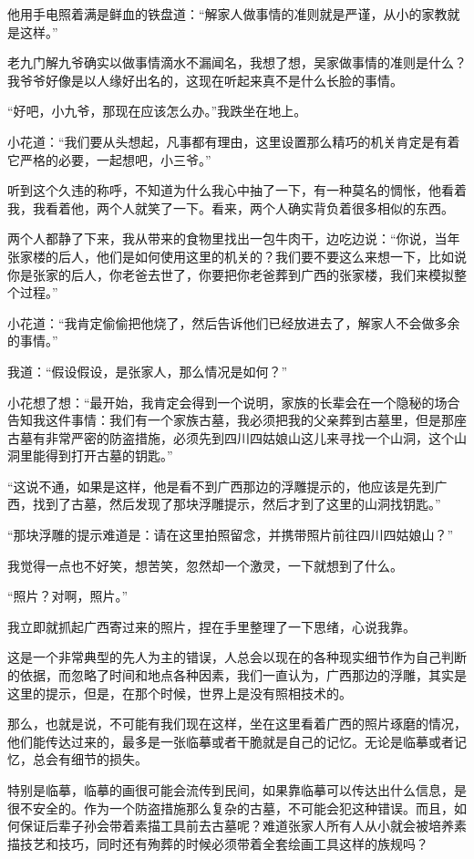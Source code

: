 他用手电照着满是鲜血的铁盘道：“解家人做事情的准则就是严谨，从小的家教就是这样。”

老九门解九爷确实以做事情滴水不漏闻名，我想了想，吴家做事情的准则是什么？我爷爷好像是以人缘好出名的，这现在听起来真不是什么长脸的事情。

“好吧，小九爷，那现在应该怎么办。”我跌坐在地上。

小花道：“我们要从头想起，凡事都有理由，这里设置那么精巧的机关肯定是有着它严格的必要，一起想吧，小三爷。”

听到这个久违的称呼，不知道为什么我心中抽了一下，有一种莫名的惆怅，他看着我，我看着他，两个人就笑了一下。看来，两个人确实背负着很多相似的东西。

两个人都静了下来，我从带来的食物里找出一包牛肉干，边吃边说：“你说，当年张家楼的后人，他们是如何使用这里的机关的？我们要不要这么来想一下，比如说你是张家的后人，你老爸去世了，你要把你老爸葬到广西的张家楼，我们来模拟整个过程。”

小花道：“我肯定偷偷把他烧了，然后告诉他们已经放进去了，解家人不会做多余的事情。”

我道：“假设假设，是张家人，那么情况是如何？”

小花想了想：“最开始，我肯定会得到一个说明，家族的长辈会在一个隐秘的场合告知我这件事情：我们有一个家族古墓，我必须把我的父亲葬到古墓里，但是那座古墓有非常严密的防盗措施，必须先到四川四姑娘山这儿来寻找一个山洞，这个山洞里能得到打开古墓的钥匙。”

“这说不通，如果是这样，他是看不到广西那边的浮雕提示的，他应该是先到广西，找到了古墓，然后发现了那块浮雕提示，然后才到了这里的山洞找钥匙。”

“那块浮雕的提示难道是：请在这里拍照留念，并携带照片前往四川四姑娘山？”

我觉得一点也不好笑，想苦笑，忽然却一个激灵，一下就想到了什么。

“照片？对啊，照片。”

我立即就抓起广西寄过来的照片，捏在手里整理了一下思绪，心说我靠。

这是一个非常典型的先人为主的错误，人总会以现在的各种现实细节作为自己判断的依据，而忽略了时间和地点各种因素，我们一直认为，广西那边的浮雕，其实是这里的提示，但是，在那个时候，世界上是没有照相技术的。

那么，也就是说，不可能有我们现在这样，坐在这里看着广西的照片琢磨的情况，他们能传达过来的，最多是一张临摹或者干脆就是自己的记忆。无论是临摹或者记忆，总会有细节的损失。

特别是临摹，临摹的画很可能会流传到民间，如果靠临摹可以传达出什么信息，是很不安全的。作为一个防盗措施那么复杂的古墓，不可能会犯这种错误。而且，如何保证后辈子孙会带着素描工具前去古墓呢？难道张家人所有人从小就会被培养素描技艺和技巧，同时还有殉葬的时候必须带着全套绘画工具这样的族规吗？

